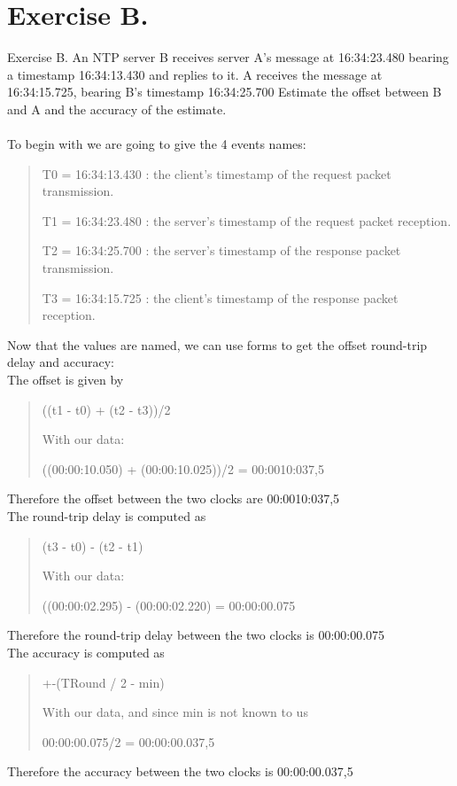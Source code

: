 \section{Exercise B.}
Exercise B. An NTP server B receives server A’s message at 16:34:23.480 bearing a timestamp 16:34:13.430 and replies to it. A receives the message at 16:34:15.725, bearing B’s timestamp 16:34:25.700 Estimate the offset between B and A and the accuracy of the estimate.\\\\
To begin with we are going to give the 4 events names:
\begin{quote}
T0 = 16:34:13.430 	: the client's timestamp of the request packet transmission.

T1 = 16:34:23.480 	: the server's timestamp of the request packet reception.

T2 = 16:34:25.700 	: the server's timestamp of the response packet transmission.

T3 = 16:34:15.725 	: the client's timestamp of the response packet reception.
\end{quote}
Now that the values are named, we can use forms to get the offset round-trip delay and accuracy:\\

The offset is given by
\begin{quote}
((t1 - t0) + (t2 - t3))/2

With our data:

((00:00:10.050) + (00:00:10.025))/2 = 00:0010:037,5
\end{quote}
Therefore the offset between the two clocks are 00:0010:037,5\\

The round-trip delay is computed as
\begin{quote}
(t3 - t0) - (t2 - t1)

With our data:

((00:00:02.295) - (00:00:02.220) = 00:00:00.075
\end{quote}
Therefore the round-trip delay between the two clocks is 00:00:00.075\\

The accuracy is computed as
\begin{quote}
+-(TRound / 2 - min)

With our data, and since min is not known to us

00:00:00.075/2 = 00:00:00.037,5
\end{quote}
Therefore the accuracy between the two clocks is 00:00:00.037,5
\newpage